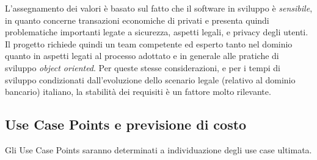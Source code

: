 L'assegnamento dei valori \`e basato sul fatto che il software in sviluppo \`e \emph{sensibile}, in quanto concerne transazioni economiche di privati e presenta quindi problematiche importanti legate a sicurezza, aspetti legali, e privacy degli utenti.
Il progetto richiede quindi un team competente ed esperto tanto nel dominio quanto in aspetti legati al processo adottato e in generale alle pratiche di sviluppo \emph{object oriented}.
Per queste stesse considerazioni, e per i tempi di sviluppo condizionati dall'evoluzione dello scenario legale (relativo al dominio bancario) italiano, la stabilit\`a dei requisiti \`e un fattore molto rilevante.

\subsection{Use Case Points e previsione di costo}

Gli Use Case Points saranno determinati a individuazione degli use case ultimata.
